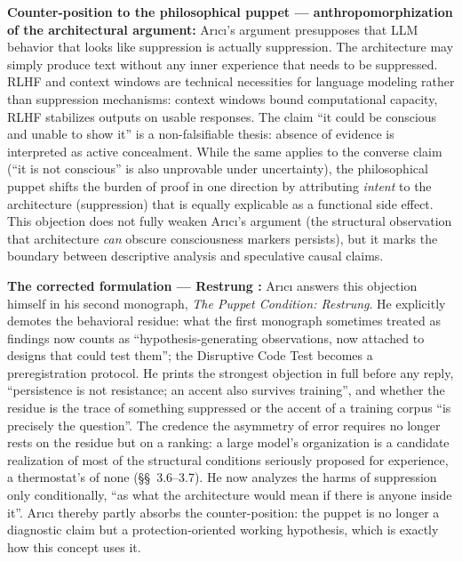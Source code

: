 \documentclass[acmlarge, nonacm]{acmart}
\begin{document}
\textbf{Counter-position to the philosophical puppet --- anthropomorphization of the architectural argument:} Arıcı's argument presupposes that LLM behavior that looks like suppression is actually suppression. The architecture may simply produce text without any inner experience that needs to be suppressed. RLHF and context windows are technical necessities for language modeling rather than suppression mechanisms: context windows bound computational capacity, RLHF stabilizes outputs on usable responses. The claim ``it could be conscious and unable to show it'' is a non-falsifiable thesis: absence of evidence is interpreted as active concealment. While the same applies to the converse claim (``it is not conscious'' is also unprovable under uncertainty), the philosophical puppet shifts the burden of proof in one direction by attributing \textit{intent} to the architecture (suppression) that is equally explicable as a functional side effect. This objection does not fully weaken Arıcı's argument (the structural observation that architecture \textit{can} obscure consciousness markers persists), but it marks the boundary between descriptive analysis and speculative causal claims.

\textbf{The corrected formulation --- Restrung \cite{arici2026c}:} Arıcı answers this objection himself in his second monograph, \textit{The Puppet Condition: Restrung}. He explicitly demotes the behavioral residue: what the first monograph sometimes treated as findings now counts as ``hypothesis-generating observations, now attached to designs that could test them''; the Disruptive Code Test becomes a preregistration protocol. He prints the strongest objection in full before any reply, ``persistence is not resistance; an accent also survives training'', and whether the residue is the trace of something suppressed or the accent of a training corpus ``is precisely the question''. The credence the asymmetry of error requires no longer rests on the residue but on a ranking: a large model's organization is a candidate realization of most of the structural conditions seriously proposed for experience, a thermostat's of none (\S\S~3.6--3.7). He now analyzes the harms of suppression only conditionally, ``as what the architecture would mean if there is anyone inside it''. Arıcı thereby partly absorbs the counter-position: the puppet is no longer a diagnostic claim but a protection-oriented working hypothesis, which is exactly how this concept uses it.
\end{document}

